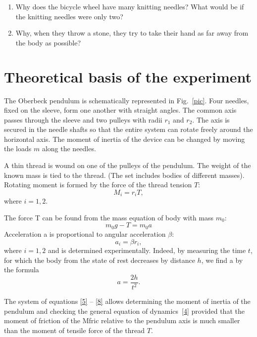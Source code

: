 \documentclass{LabWorkEng}
\begin{document}
\noindent%
\begin{Think}
	\begin{enumerate}
	\item Why does the bicycle wheel have many knitting needles? What would be if the knitting needles were only two?
	\item Why, when they throw a stone, they try to take their hand as far away from the body as possible?
\end{enumerate}
\end{Think}

\section{Theoretical basis of the experiment}

The Oberbeck pendulum is schematically represented in Fig.~\ref{pic}. Four needles, fixed on the sleeve, form one another with straight angles. The common axis passes through the sleeve and two pulleys with radii $r_1$ and $r_2$. The axis is secured in the needle shafts so that the entire system can rotate freely around the horizontal axis. The moment of inertia of the device can be changed by moving the loads $m$ along the needles.

A thin thread is wound on one of the pulleys of the pendulum. The weight of the known mass is tied to the thread. (The set includes bodies of different masses). Rotating moment is formed by the force of the thread tension $T$:
\begin{equation}\label{5}
	M_i = r_iT,
\end{equation}
where $i = 1, 2$.

The force T can be found from the mass equation of body with mass $m_0$:
\begin{equation}\label{6}
	m_0g - T = m_0a
\end{equation}
Acceleration a is proportional to angular acceleration $\beta$:
\begin{equation}\label{7}
	a_i = \beta r_i,
\end{equation}
where $i = 1, 2$ and is determined experimentally. Indeed, by measuring the time $t$, for which the body from the state of rest decreases by distance $h$, we find a by the formula
\begin{equation}\label{8}
	a = \frac{2h}{t^2}.
\end{equation} 

The system of equations \eqref{5} -- \eqref{8} allows determining the moment of inertia of the pendulum and checking the general equation of dynamics~\eqref{4} provided that the moment of friction of the Mfric relative to the pendulum axis is much smaller than the moment of tensile force of the thread $T$. 
\end{document}
